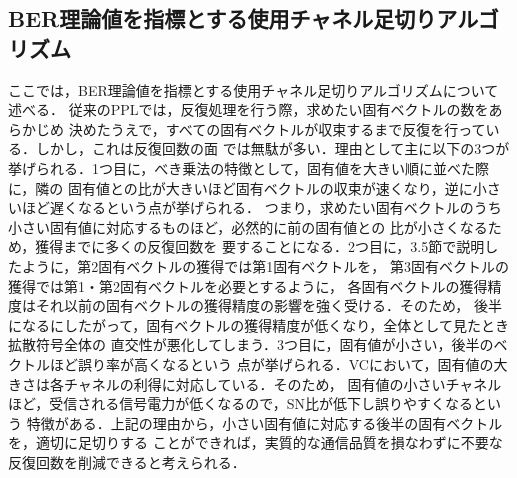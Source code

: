 \subsection{BER理論値を指標とする使用チャネル足切りアルゴリズム}
ここでは，BER理論値を指標とする使用チャネル足切りアルゴリズムについて述べる．
従来のPPLでは，反復処理を行う際，求めたい固有ベクトルの数をあらかじめ
決めたうえで，すべての固有ベクトルが収束するまで反復を行っている．しかし，これは反復回数の面
では無駄が多い．理由として主に以下の3つが挙げられる．1つ目に，べき乗法の特徴として，固有値を大きい順に並べた際に，隣の
固有値との比が大きいほど固有ベクトルの収束が速くなり，逆に小さいほど遅くなるという点が挙げられる．
つまり，求めたい固有ベクトルのうち小さい固有値に対応するものほど，必然的に前の固有値との
比が小さくなるため，獲得までに多くの反復回数を
要することになる．2つ目に，3.5節で説明したように，第2固有ベクトルの獲得では第1固有ベクトルを，
第3固有ベクトルの獲得では第1・第2固有ベクトルを必要とするように，
各固有ベクトルの獲得精度はそれ以前の固有ベクトルの獲得精度の影響を強く受ける．そのため，
後半になるにしたがって，固有ベクトルの獲得精度が低くなり，全体として見たとき拡散符号全体の
直交性が悪化してしまう．3つ目に，固有値が小さい，後半のベクトルほど誤り率が高くなるという
点が挙げられる．VCにおいて，固有値の大きさは各チャネルの利得に対応している．そのため，
固有値の小さいチャネルほど，受信される信号電力が低くなるので，SN比が低下し誤りやすくなるという
特徴がある．上記の理由から，小さい固有値に対応する後半の固有ベクトルを，適切に足切りする
ことができれば，実質的な通信品質を損なわずに不要な反復回数を削減できると考えられる．

